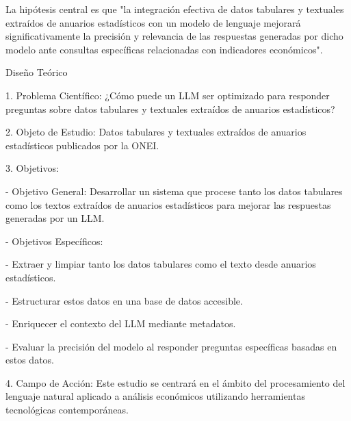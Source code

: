 \documentclass[12pt]{report} %
\begin{document}
La hipótesis central es que "la integración efectiva de datos tabulares y textuales extraídos de anuarios estadísticos con un modelo de lenguaje mejorará significativamente la precisión y relevancia de las respuestas generadas por dicho modelo ante consultas específicas relacionadas con indicadores económicos".\par

Diseño Teórico\par
1. Problema Científico: ¿Cómo puede un LLM ser optimizado para responder preguntas sobre datos tabulares y textuales extraídos de anuarios estadísticos?\par

2. Objeto de Estudio: Datos tabulares y textuales extraídos de anuarios estadísticos publicados por la ONEI.\par

3. Objetivos:\par
   - Objetivo General: Desarrollar un sistema que procese tanto los datos tabulares como los textos extraídos de anuarios estadísticos para mejorar las respuestas generadas por un LLM.\par
   - Objetivos Específicos:\par
     - Extraer y limpiar tanto los datos tabulares como el texto desde anuarios estadísticos.\par
     - Estructurar estos datos en una base de datos accesible.\par
     - Enriquecer el contexto del LLM mediante metadatos.\par
     - Evaluar la precisión del modelo al responder preguntas específicas basadas en estos datos.\par

4. Campo de Acción: Este estudio se centrará en el ámbito del procesamiento del lenguaje natural aplicado a análisis económicos utilizando herramientas tecnológicas contemporáneas.\par

\newpage
\printbibliography
\end{document}

